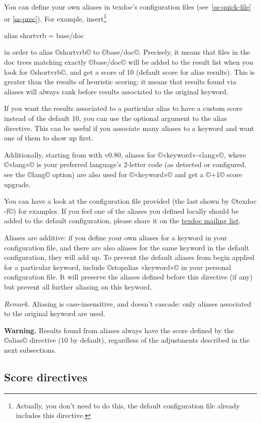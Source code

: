\documentclass[a4paper, oneside]{scrartcl}
\makeatletter
\newenvironment{htcode}{%
  \SaveVerbatim[samepage, gobble=2]{verbmat}%
  }{%
  \endSaveVerbatim
  \par\medskip\noindent\hspace*{\parindent}%
  \BUseVerbatim{verbmat}%
  \par\medskip\@endpetrue}
\newcommand\tdml{\href{mailto:texdoc@tug.org}{texdoc mailing list}\xspace}
\makeatother
\begin{document}
You can define your own aliases in texdoc's configuration files
(see~\ref{ss-quick-file} or \ref{ss-prec}). For example,
insert\footnote{Actually, you don't need to do this, the default configuration
  file already includes this directive.}
\begin{htcode}
  alias shortvrb = base/doc
\end{htcode}
in order to alias ©shortvrb© to ©base/doc©. Precisely, it means that files in
the doc trees matching exactly ©base/doc© will be added to the result list
when you look for ©shortvrb©, and get a score of 10 (default score for alias
results). This is greater than the results of heuristic scoring: it means that
results found via aliases will always rank before results associated to the
original keyword.

If you want the results associated to a particular alias to have a custom
score instead of the default 10, you can use the optional argument to the
alias directive. This can be useful if you associate many aliases to
a keyword and want one of them to show up first.

Additionally, starting from with v0.80, aliases for ©«keyword»-«lang»©, where
©«lang»© is your preferred language's 2-letter code (as detected or
configured, see the ©lang© option) are also used for ©«keyword»© and get a
©+1© score upgrade.

You can have a look at the configuration file provided (the last shown by
©texdoc -f©) for examples.  If you feel one of the aliases you defined locally
should be added to the default configuration, please share it on the \tdml.

Aliases are additive: if you define your own aliases for a keyword in your
configuration file, and there are also aliases for the same keyword in the
default configuration, they will add up. To prevent the default aliases
from begin applied for a particular keyword, include ©stopalias «keyword»© in
your personal configuration file. It will preserve the aliases defined before
this directive (if any) but prevent all further aliasing on this keyword.

\textit{Remark.} Aliasing is case-insensitive, and doesn't cascade:
only aliases associated to the original keyword are used.

\textbf{Warning.} Results found from aliases always have the score defined by
the ©alias© directive (10 by default), regardless of the adjustments described
in the next subsections.

\subsection{Score directives}\label{ss-score}
\end{document}
